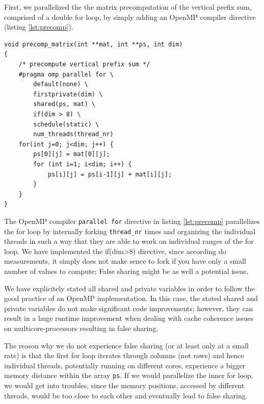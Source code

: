 \documentclass[conference]{IEEEtran}
\begin{document}
First, we parallelized the the matrix precomputation of the vertical prefix sum, comprised of a double for loop, by simply adding an OpenMP compiler directive (listing \ref{lst:precomp}).

\begin{center}
   \begin{lstlisting}[captionpos=b, caption=OpenMP: Parallel Matrix Pre-Computation of the Vertical Sum, label=lst:precomp]                                            
void precomp_matrix(int **mat, int **ps, int dim)                                  
{                                             
    /* precompute vertical prefix sum */  
    #pragma omp parallel for \ 
        default(none) \        
        firstprivate(dim) \    
        shared(ps, mat) \      
        if(dim > 8) \          
        schedule(static) \     
        num_threads(thread_nr)     
    for(int j=0; j<dim; j++) {                
        ps[0][j] = mat[0][j];                 
        for (int i=1; i<dim; i++) {           
            ps[i][j] = ps[i-1][j] + mat[i][j];
        }                                     
    }                                         
}                                             
   \end{lstlisting}
\end{center}

The OpenMP compiler \texttt{parallel for} directive in listing \ref{lst:precomp} parallelizes the for loop by internally forking \texttt{thread\_nr} times and organizing the individual threads in such a way that they are able to work on individual ranges of the for loop. We have implemented the if(dim>8) directive, since according do measurements, it simply does not make sence to fork if you have only a small number of values to compute; False sharing might be as well a potential issue. 

We have explicitely stated all shared and private variables in order to follow the good practice of an OpenMP implementation. In this case, the stated shared and private variables do not make significant code improvements; however, they can result in a huge runtime improvement when dealing with cache coherence issues on multicore-processors resulting in false sharing. 

The reason why we do not experience false sharing (or at least only at a small rate) is that the first for loop iterates through columns (not rows) and hence individual threads, potentially running on different cores, experience a bigger memory distance within the array \texttt{ps}. If we would parallelize the inner for loop, we would get into troubles, since the memory positions, accessed by different threads, would be too close to each other and eventually lead to false sharing. 
\end{document}

